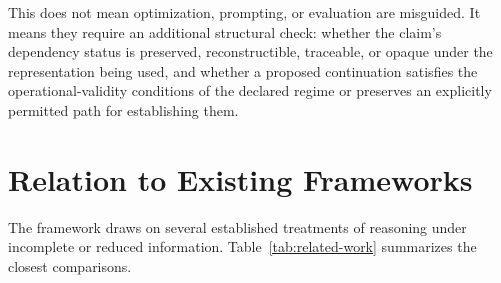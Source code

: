 \documentclass[11pt]{article}
\theoremstyle{definition}
\theoremstyle{remark}
\begin{document}
This does not mean optimization, prompting, or evaluation are misguided. It means they require an additional structural check: whether the claim's dependency status is preserved, reconstructible, traceable, or opaque under the representation being used, and whether a proposed continuation satisfies the operational-validity conditions of the declared regime or preserves an explicitly permitted path for establishing them.

\section{Relation to Existing Frameworks}

The framework draws on several established treatments of reasoning under incomplete or reduced information. Table~\ref{tab:related-work} summarizes the closest comparisons.
\end{document}
